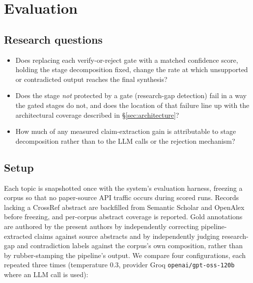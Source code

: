\documentclass[11pt]{article}
\newcommand{\NumRuns}{three}     %
\begin{document}
\section{Evaluation}
\label{sec:evaluation}

\subsection{Research questions}

\begin{itemize}
 \item[\textbf{RQ1}] Does replacing each verify-or-reject gate with a matched
 confidence score, holding the stage decomposition fixed, change the rate at
 which unsupported or contradicted output reaches the final synthesis?
 \item[\textbf{RQ2}] Does the stage \emph{not} protected by a gate
 (research-gap detection) fail in a way the gated stages do not, and does the
 location of that failure line up with the architectural coverage described in
 \S\ref{sec:architecture}?
 \item[\textbf{RQ3}] How much of any measured claim-extraction gain is
 attributable to stage decomposition rather than to the LLM calls or the
 rejection mechanism?
\end{itemize}

\subsection{Setup}

Each topic is snapshotted once with the system's evaluation harness, freezing a
corpus so that no paper-source API traffic occurs during scored runs. Records
lacking a CrossRef abstract are backfilled from Semantic Scholar and OpenAlex
before freezing, and per-corpus abstract coverage is reported. Gold annotations
are authored by the present authors by independently correcting
pipeline-extracted claims against source abstracts and by independently judging
research-gap and contradiction labels against the corpus's own composition,
rather than by rubber-stamping the pipeline's output. We compare four
configurations, each repeated \NumRuns{} times (temperature 0.3, provider Groq
\texttt{openai/gpt-oss-120b} where an LLM call is used):
\end{document}
